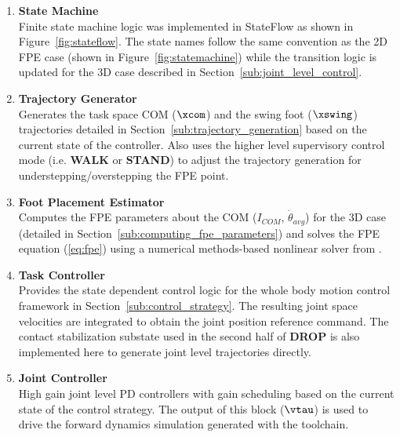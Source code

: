 \begin{enumerate}
	\item \textbf{State Machine} \\ 
	Finite state machine logic was implemented in StateFlow as shown in Figure~\ref{fig:stateflow}. The state names follow the same convention as the 2D FPE case (shown in Figure~\ref{fig:statemachine}) while the transition logic is updated for the 3D case described in Section~\ref{sub:joint_level_control}.  \\

	\item \textbf{Trajectory Generator} \\ 
	Generates the task space COM ($\xcom$) and the swing foot ($\xswing$) trajectories detailed in Section~\ref{sub:trajectory_generation} based on the current state of the controller. Also uses the higher level supervisory control mode (i.e. \textbf{WALK} or \textbf{STAND}) to adjust the trajectory generation for understepping/overstepping the FPE point. \\

	\item \textbf{Foot Placement Estimator} \\ 
	Computes the FPE parameters about the COM ($I_{COM}$, $\dot{\theta}_{avg}$) for the 3D case (detailed in Section~\ref{sub:computing_fpe_parameters}) and solves the FPE equation (\ref{eq:fpe}) using a numerical methods-based nonlinear solver from \cite{Wight:2008vt}. \\

	\item \textbf{Task Controller} \\ 
	Provides the state dependent control logic for the whole body motion control framework in Section~\ref{sub:control_strategy}. The resulting joint space velocities are integrated to obtain the joint position reference command. The contact stabilization substate used in the second half of \textbf{DROP} is also implemented here to generate joint level trajectories directly. \\

	\item \textbf{Joint Controller} \\ 
	High gain joint level PD controllers with gain scheduling based on the current state of the control strategy. The output of this block ($\vtau$) is used to drive the forward dynamics simulation generated with the toolchain. \\

\end{enumerate}

